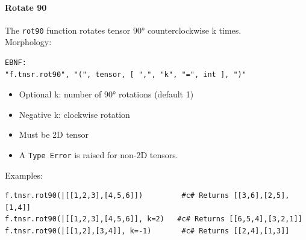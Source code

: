 \paragraph{Rotate 90}
The \texttt{rot90} function rotates tensor 90° counterclockwise k times.\\
Morphology:
\begin{verbatim}
EBNF:
"f.tnsr.rot90", "(", tensor, [ ",", "k", "=", int ], ")"
\end{verbatim}
\begin{itemize}
\item Optional k: number of 90° rotations (default 1)
\item Negative k: clockwise rotation
\item Must be 2D tensor
\item A \texttt{Type Error} is raised for non-2D tensors.
\end{itemize}
Examples:
\begin{verbatim}
f.tnsr.rot90(|[[1,2,3],[4,5,6]])         #c# Returns [[3,6],[2,5],[1,4]]
f.tnsr.rot90(|[[1,2,3],[4,5,6]], k=2)   #c# Returns [[6,5,4],[3,2,1]]
f.tnsr.rot90(|[[1,2],[3,4]], k=-1)       #c# Returns [[2,4],[1,3]]
\end{verbatim}

